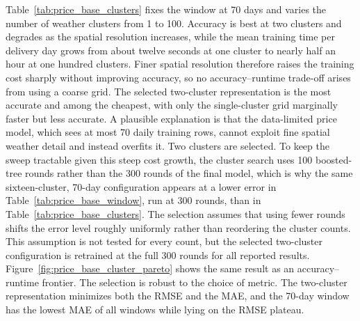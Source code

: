 Table~\ref{tab:price_base_clusters} fixes the window at 70 days and varies the
number of weather clusters from 1 to 100. Accuracy is best at two clusters and
degrades as the spatial resolution increases, while the mean training time per
delivery day grows from about twelve seconds at one cluster to nearly half an
hour at one hundred clusters. Finer spatial resolution therefore raises the
training cost sharply without improving accuracy, so no accuracy--runtime
trade-off arises from using a coarse grid. The selected two-cluster
representation is the most accurate and among the cheapest, with only the
single-cluster grid marginally faster but less accurate. A plausible explanation
is that the data-limited price model, which sees at most 70 daily training rows,
cannot exploit fine spatial weather detail and instead overfits it. Two clusters
are selected. To keep the sweep tractable given this steep cost growth, the cluster
search uses 100 boosted-tree rounds rather than the 300 rounds of the final
model, which is why the same sixteen-cluster, 70-day configuration appears at a
lower error in Table~\ref{tab:price_base_window}, run at 300 rounds, than in
Table~\ref{tab:price_base_clusters}. The selection assumes that using fewer
rounds shifts the error level roughly uniformly rather than reordering the
cluster counts. This assumption is not tested for every count, but the selected
two-cluster configuration is retrained at the full 300 rounds for all reported
results.
Figure~\ref{fig:price_base_cluster_pareto} shows the same result as an
accuracy--runtime frontier. The selection is robust to the choice of metric. The two-cluster
representation minimizes both the RMSE and the MAE, and the 70-day window has
the lowest MAE of all windows while lying on the RMSE plateau.

